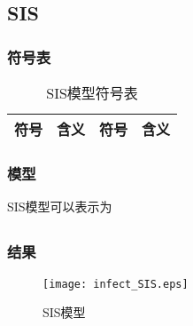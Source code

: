 \subsection{SIS}
\subsubsection{符号表}
	\begin{table}[H]
	\centering
	\caption{SIS模型符号表}
	\begin{tabular}{llll}
		\hline
		符号&含义&符号&含义\\
		\hline
		\hline
	\end{tabular}
	\end{table}
\subsubsection{模型}
	SIS模型可以表示为
	\begin{align}
	\end{align}
\subsubsection{结果}
	\begin{figure}[H]
		\centering
		\texttt{[image: infect\_SIS.eps]}
		\caption{SIS模型}
	\end{figure}